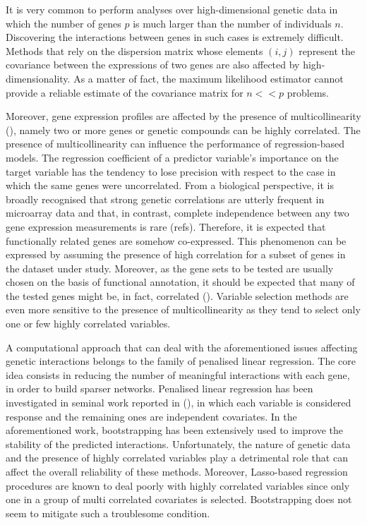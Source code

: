 It is very common to perform analyses over high-dimensional genetic data in which the number of genes $p$ is much larger than the number of individuals $n$. Discovering the interactions between genes in such cases is extremely difficult. Methods that rely on the dispersion matrix whose elements $(i,j)$ represent the covariance between the expressions of two genes are also affected by high-dimensionality. As a matter of fact, the maximum likelihood estimator cannot provide a reliable estimate of the covariance matrix for $n<<p$ problems. 

Moreover, gene expression profiles are affected by the presence of multicollinearity (\citealp{est_multicoll, ml_multicoll}), namely two or more genes or genetic compounds can be highly correlated. The presence of multicollinearity can influence the performance of regression-based models. The regression coefficient of a predictor variable's importance on the target variable has the tendency to lose precision with respect to the case in which the same genes were uncorrelated. 
From a biological perspective, it is broadly recognised that strong genetic correlations are utterly frequent in microarray data and that, in contrast, complete independence between any two gene expression measurements is rare (refs). Therefore, it is expected that functionally related genes are somehow co-expressed. This phenomenon can be expressed by assuming the presence of high correlation for a subset of genes in the dataset under study. Moreover, as the gene sets to be tested are usually chosen on the basis of functional annotation, it should be expected that many of the tested genes might be, in fact, correlated (\citealp{genesets}).
Variable selection methods are even more sensitive to the presence of multicollinearity as they tend to select only one or few highly correlated variables.

A computational approach that can deal with the aforementioned issues affecting genetic interactions belongs to the family of penalised linear regression. The core idea consists in reducing the number of meaningful interactions with each gene, in order to build sparser networks. Penalised linear regression has been investigated in seminal work reported in (\citealp{Tibshirani94regressionshrinkage, Meinshausen06highdimensional, finegold, Meinshausen_stabilityselection}), in which each variable is considered response and the remaining ones are independent covariates. In the aforementioned work, bootstrapping has been extensively used to improve the stability of the predicted interactions. Unfortunately, the nature of genetic data and the presence of highly correlated variables play a detrimental role that can affect the overall reliability of these methods. Moreover, Lasso-based regression procedures are known to deal poorly with highly correlated variables since only one in a group of multi correlated covariates is selected. Bootstrapping does not seem to mitigate such a troublesome condition.

